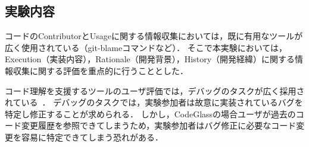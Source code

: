 




\subsection{実験内容}

コードのContributorとUsageに関する情報収集においては，既に有用なツールが広く使用されている（git-blameコマンドなど）．
そこで本実験においては，Execution（実装内容），Rationale（開発背景），History（開発経緯）に関する情報収集に関する評価を重点的に行うこととした．

コード理解を支援するツールのユーザ評価では，デバッグのタスクが広く採用されている~\cite{Improving_API_Documentation_Usability_with_Knowledge_Pushing,Code_Bubbles}．
デバッグのタスクでは，実験参加者は故意に実装されているバグを特定し修正することが求められる．
しかし，CodeGlassの場合ユーザが過去のコード変更履歴を参照できてしまうため，実験参加者はバグ修正に必要なコード変更を容易に特定できてしまう恐れがある．


